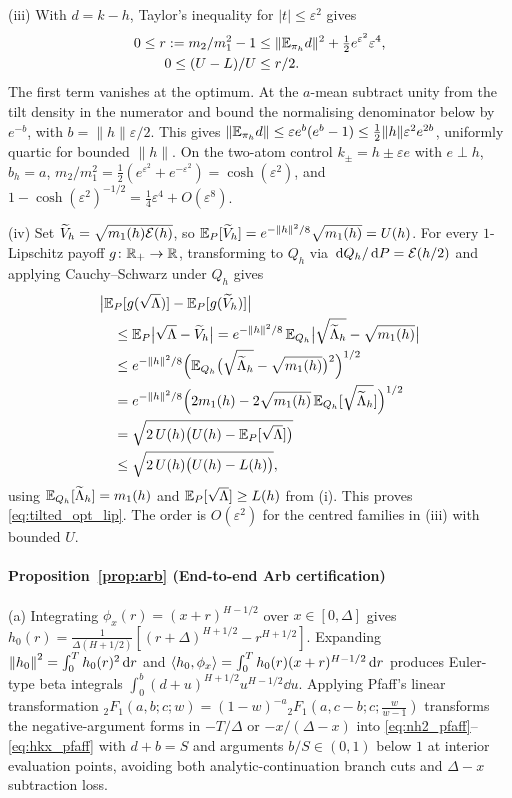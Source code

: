 (iii) With $d=k-h$, Taylor's inequality for $|t|\le\varepsilon^2$ gives
\[
\begin{aligned}
 0\le r:=m_2/m_1^2-1
 &\le \|\mathbb{E}_{\pi_h}d\|^2+\tfrac12 e^{\varepsilon^2}\varepsilon^4,\\
 0\le (U-L)/U&\le r/2 .
\end{aligned}
\]
The first term vanishes at the optimum. At the $a$-mean subtract unity from the tilt density
in the numerator and bound the normalising denominator below by $e^{-b}$, with
$b=\|h\|\varepsilon/2$. This gives
$\|\mathbb{E}_{\pi_h}d\|\le\varepsilon e^b(e^b-1)\le
\tfrac12\|h\|\varepsilon^2 e^{2b}$, uniformly quartic for bounded $\|h\|$.
On the two-atom control
$k_\pm=h\pm\varepsilon e$ with $e\perp h$, $b_h=a$, $m_2/m_1^2=\frac12(e^{\varepsilon^2}+e^{-\varepsilon^2})=\cosh(\varepsilon^2)$,
and $1-\cosh(\varepsilon^2)^{-1/2}=\frac14\varepsilon^4+O(\varepsilon^8)$.

(iv) Set $\widetilde{V}_h=\sqrt{m_1(h)\mathcal{E}(h)}$, so $\mathbb{E}_P[\widetilde{V}_h]=e^{-\left\lVert h\right\rVert^2/8}\sqrt{m_1(h)}=U(h)$.
For every $1$-Lipschitz payoff $g\colon\mathbb{R}_+\to\mathbb{R}$, transforming to $Q_h$ via $\,\mathrm{d} Q_h/\,\mathrm{d} P=\mathcal{E}(h/2)$ and
applying Cauchy--Schwarz under $Q_h$ gives
\begin{align*}
  &\big|\mathbb{E}_P[g(\sqrt{\Lambda})]-\mathbb{E}_P[g(\widetilde{V}_h)]\big|\\
  &\quad\le\mathbb{E}_P\big|\sqrt{\Lambda}-\widetilde{V}_h\big|
  =e^{-\left\lVert h\right\rVert^2/8}\,\mathbb{E}_{Q_h}\big|\sqrt{\widetilde{\Lambda}_h}-\sqrt{m_1(h)}\big|\\
  &\quad\le e^{-\left\lVert h\right\rVert^2/8}\Big(\mathbb{E}_{Q_h}\big(\sqrt{\widetilde{\Lambda}_h}-\sqrt{m_1(h)}\big)^2\Big)^{1/2}\\
  &\quad=e^{-\left\lVert h\right\rVert^2/8}\Big(2m_1(h)
    -2\sqrt{m_1(h)}\,\mathbb{E}_{Q_h}[\sqrt{\widetilde{\Lambda}_h}]\Big)^{1/2}\\
  &\quad=\sqrt{2\,U(h)\big(U(h)-\mathbb{E}_P[\sqrt{\Lambda}]\big)}\\
  &\quad\le\sqrt{2\,U(h)\big(U(h)-L(h)\big)},
\end{align*}
using $\mathbb{E}_{Q_h}[\widetilde{\Lambda}_h]=m_1(h)$ and $\mathbb{E}_P[\sqrt{\Lambda}]\ge L(h)$ from (i). This proves
\eqref{eq:tilted_opt_lip}. The order is $O(\varepsilon^2)$ for the centred families in (iii) with bounded $U$.

\paragraph{Proposition~\ref{prop:arb} (End-to-end Arb certification)}
(a) Integrating $\phi_x(r)=(x+r)^{H-1/2}$ over $x\in[0,\Delta]$ gives
$h_0(r)=\frac{1}{\Delta(H+1/2)}[(r+\Delta)^{H+1/2}-r^{H+1/2}]$. Expanding
$\left\lVert h_0\right\rVert^2=\int_0^T h_0(r)^2\,\mathrm{d} r$ and $\left\langle h_0,\phi_x\right\rangle=\int_0^T h_0(r)(x+r)^{H-1/2}\,\mathrm{d} r$ produces
Euler-type beta integrals $\int_0^b(d+u)^{H+1/2}u^{H-1/2}\dd u$. Applying Pfaff's linear transformation
${}_2F_1(a,b;c;w)=(1-w)^{-a}{}_2F_1(a,c-b;c;\frac{w}{w-1})$ transforms the negative-argument forms in
$-T/\Delta$ or $-x/(\Delta-x)$ into \eqref{eq:nh2_pfaff}--\eqref{eq:hkx_pfaff} with $d+b=S$ and
arguments $b/S\in(0,1)$ below $1$ at interior evaluation points, avoiding both analytic-continuation branch cuts and
$\Delta-x$ subtraction loss.

